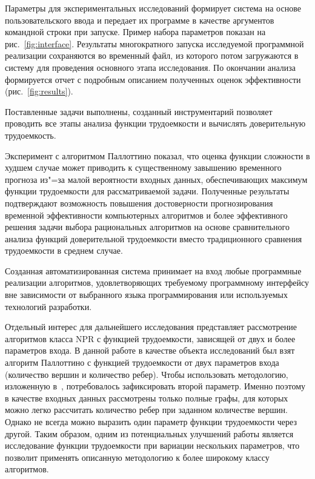\documentclass[a4paper, article, 14pt]{extarticle}
\begin{document}
Параметры для экспериментальных исследований формирует система на основе пользовательского ввода и передает их программе в качестве аргументов командной строки при запуске. Пример набора параметров показан на рис.~\ref{fig:interface}. Результаты многократного запуска исследуемой программной реализации сохраняются во временный файл, из которого потом загружаются в систему для проведения основного этапа исследования. По окончании анализа формируется отчет с подробным описанием полученных оценок эффективности (рис.~\ref{fig:results}).

\label{sec:conclusion}

Поставленные задачи выполнены, созданный инструментарий позволяет проводить все этапы анализа функции трудоемкости и вычислять доверительную трудоемкость.

Эксперимент с алгоритмом Паллоттино показал, что оценка функции сложности в худшем случае может приводить к существенному завышению временного прогноза из"=за малой вероятности входных данных, обеспечивающих максимум функции трудоемкости для рассматриваемой задачи. Полученные результаты подтверждают возможность повышения достоверности прогнозирования временной эффективности компьютерных алгоритмов и более эффективного решения задачи выбора рациональных алгоритмов на основе сравнительного анализа функций доверительной трудоемкости вместо традиционного сравнения трудоемкости в среднем случае.

Созданная автоматизированная система принимает на вход любые программные реализации алгоритмов, удовлетворяющих требуемому программному интерфейсу вне зависимости от выбранного языка программирования или используемых технологий разработки.

Отдельный интерес для дальнейшего исследования представляет рассмотрение алгоритмов класса NPR с функцией трудоемкости, зависящей от двух и более параметров входа. В данной работе в качестве объекта исследований был взят алгоритм Паллоттино с функцией трудоемкости от двух параметров входа (количество вершин и количество ребер). Чтобы использовать методологию, изложенную в~\cite{petrushyn_ulyanov_analysis}, потребовалось зафиксировать второй параметр. Именно поэтому в качестве входных данных рассмотрены только полные графы, для которых можно легко рассчитать количество ребер при заданном количестве вершин. Однако не всегда можно выразить один параметр функции трудоемкости через другой. Таким образом, одним из потенциальных улучшений работы является исследование функции трудоемкости при вариации нескольких параметров, что позволит применять описанную методологию к более широкому классу алгоритмов.
\end{document}
